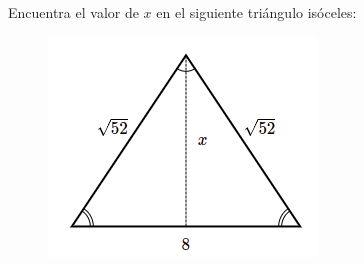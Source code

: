 Encuentra el valor de $x$ en el siguiente triángulo isóceles:

\begin{figure}[H]
    \centering
    \includegraphics[width=0.25\linewidth]{../images/pitagoras4.png}
    \caption{}
    \label{fig:pitagoras4}
\end{figure}
